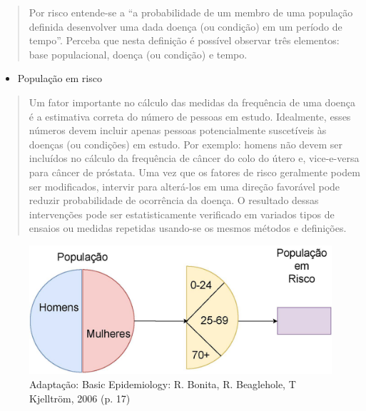 \documentclass[
]{book}
\providecommand{\tightlist}{%
  \setlength{\itemsep}{0pt}\setlength{\parskip}{0pt}}
\begin{document}
\hfill\break

\begin{quote}
Por risco entende-se a ``a probabilidade de um membro de uma população definida desenvolver uma dada doença (ou condição) em um período de tempo''. Perceba que nesta definição é possível observar três elementos: base populacional, doença (ou condição) e tempo.
\end{quote}

\hfill\break

\begin{itemize}
\tightlist
\item
  População em risco
\end{itemize}

\hfill\break

\begin{quote}
Um fator importante no cálculo das medidas da frequência de uma doença é a estimativa correta do número de pessoas em estudo. Idealmente, esses números devem incluir apenas pessoas potencialmente suscetíveis às doenças (ou condições) em estudo. Por exemplo: homens não devem ser incluídos no cálculo da frequência de câncer do colo do útero e, vice-e-versa para câncer de próstata. Uma vez que os fatores de risco geralmente podem ser modificados, intervir para alterá-los em uma direção favorável pode reduzir probabilidade de ocorrência da doença. O resultado dessas intervenções pode ser estatisticamente verificado em variados tipos de ensaios ou medidas repetidas usando-se os mesmos métodos e definições.
\end{quote}

\hfill\break

\begin{figure}

{\centering \includegraphics[width=0.6\linewidth]{images8/ilustracao_epidemiologia1} 

}

\caption{Adaptação: Basic Epidemiology: R. Bonita, R. Beaglehole, T Kjelltröm, 2006 (p. 17)}\label{fig:fig43}
\end{figure}

\hfill\break
\end{document}
